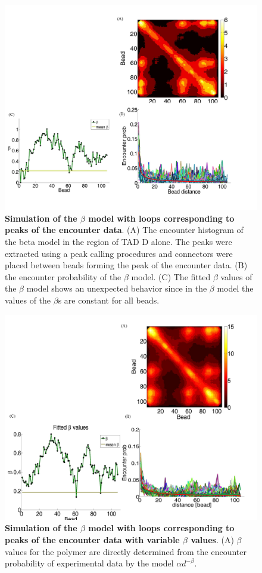 \documentclass[12pt]{article}
\begin{document}
\begin{figure}[H]
\includegraphics[scale=0.5]{Figure06_betaModelWithPeaks}
\caption{\textbf{Simulation of the $\beta$ model with loops corresponding to peaks of the encounter data}. (A) The encounter histogram of the beta model in the region of TAD D alone. The peaks were extracted using a peak calling procedures and connectors were placed between beads forming the peak of the encounter data. (B) the encounter probability of the $\beta$ model. (C) The fitted $\beta$ values of the $\beta$ model shows an unexpected behavior since in the $\beta$ model the values of the $\beta$s are constant for all beads.}
\label{simulationWithBetaPolymerWithLoops}
\end{figure}


\begin{figure}[H]
\includegraphics[scale=0.5]{Figure07_betaModelWithPeaksVariableBeta}
\caption{\textbf{Simulation of the $\beta$ model with loops corresponding to peaks of the encounter data with variable $\beta$ values}. (A) $\beta$ values for the polymer are directly determined from the encounter probability of experimental data by the model $\alpha d^{-\beta}$.}
\label{simulationWithBetaPolymerWithLoopsVariableBeta}
\end{figure}



\end{document}
